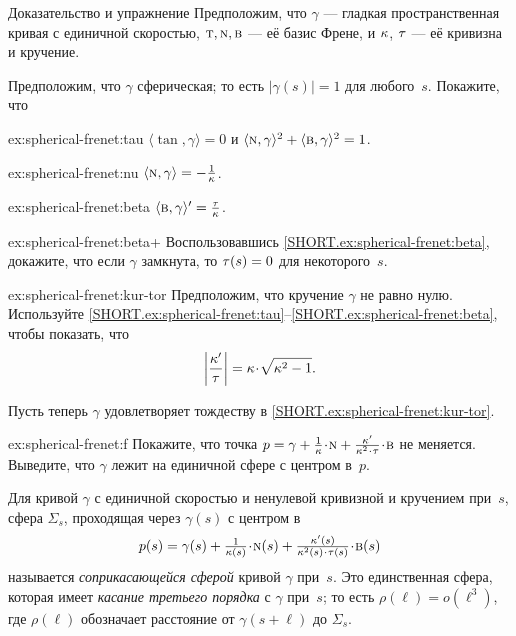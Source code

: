 \begin{thm}{Доказательство и упражнение}\label{ex:spherical-frenet}
Предположим, что $\gamma$ --- гладкая пространственная кривая с единичной скоростью,
$\text{\sc{t}},\text{\sc{n}},\text{\sc{b}}$ --- её базис Френе,
и $\kappa$, $\tau$ --- её кривизна и кручение.

\smallskip

Предположим, что $\gamma$ сферическая; то есть $|\gamma(s)|=1$ для любого~$s$.
Покажите, что

\begin{subthm}{ex:spherical-frenet:tau} $\langle\tan,\gamma\rangle=0$ и $\langle\text{\sc{n}},\gamma\rangle^2+\langle\text{\sc{b}},\gamma\rangle^2=1$.
\end{subthm}

\begin{subthm}{ex:spherical-frenet:nu} $\langle\text{\sc{n}},\gamma\rangle=-\tfrac1{\kappa}$.
\end{subthm}

\begin{subthm}{ex:spherical-frenet:beta} $\langle\text{\sc{b}},\gamma\rangle'=\tfrac{\tau}{\kappa}$.
\end{subthm}

\begin{subthm}{ex:spherical-frenet:beta+}
Воспользовавшись \ref{SHORT.ex:spherical-frenet:beta}, докажите, что если $\gamma$ замкнута, то $\tau(s)=0$ для некоторого~$s$.
\end{subthm}

\begin{subthm}{ex:spherical-frenet:kur-tor}
Предположим, что кручение $\gamma$ не равно нулю.
Используйте \ref{SHORT.ex:spherical-frenet:tau}--\ref{SHORT.ex:spherical-frenet:beta}, чтобы показать, что
\[\left|\frac{\kur'}{\tor}\right|=\kur\cdot\sqrt{\kur^2-1}.\]
\end{subthm}
Пусть теперь $\gamma$ удовлетворяет тождеству в \ref{SHORT.ex:spherical-frenet:kur-tor}.
\begin{subthm}{ex:spherical-frenet:f}
Покажите, что точка $p=\gamma+\tfrac1\kur\cdot \norm+\tfrac{\kur'}{\kur^2\cdot\tor}\cdot\bi$ не меняется.
Выведите, что $\gamma$ лежит на единичной сфере с центром в~$p$.
\end{subthm}

\end{thm}

Для кривой $\gamma$ с единичной скоростью и ненулевой кривизной и кручением при~$s$,
сфера $\Sigma_s$, проходящая через $\gamma(s)$ с центром в
\[p(s)=\gamma(s)+\tfrac1{\kur(s)}\cdot \norm(s)+\tfrac{\kur'(s)}{\kur^2(s)\cdot\tor(s)}\cdot\bi(s)\]
называется \emph{соприкасающейся сферой} кривой $\gamma$ при~$s$.
Это единственная сфера, которая имеет \emph{касание третьего порядка} с $\gamma$ при~$s$;
то есть $\rho(\ell)=o(\ell^3)$, где $\rho(\ell)$ обозначает расстояние от $\gamma(s+\ell)$ до $\Sigma_s$.
 
